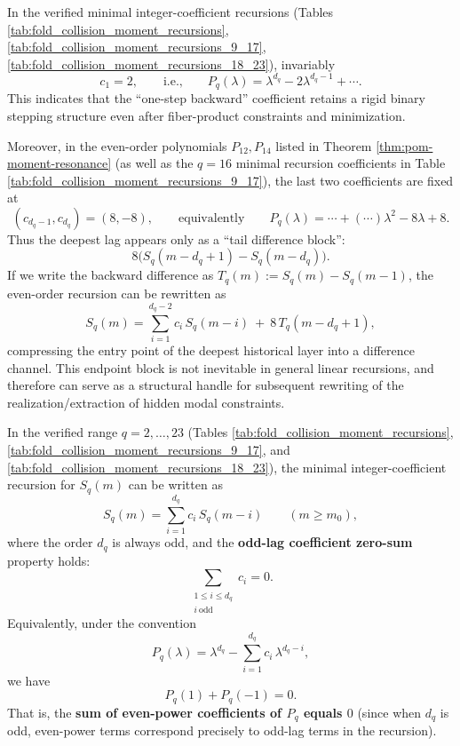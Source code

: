 




\begin{remark}\label{rem:pom-recurrence-endpoint-rigidity}
In the verified minimal integer-coefficient recursions (Tables \ref{tab:fold_collision_moment_recursions}, \ref{tab:fold_collision_moment_recursions_9_17}, \ref{tab:fold_collision_moment_recursions_18_23}), invariably
\[
c_1=2,
\qquad\text{i.e.,}\qquad
P_q(\lambda)=\lambda^{d_q}-2\lambda^{d_q-1}+\cdots.
\]
This indicates that the ``one-step backward'' coefficient retains a rigid binary stepping structure even after fiber-product constraints and minimization.
\par
Moreover, in the even-order polynomials \(P_{12},P_{14}\) listed in Theorem \ref{thm:pom-moment-resonance} (as well as the \(q=16\) minimal recursion coefficients in Table \ref{tab:fold_collision_moment_recursions_9_17}), the last two coefficients are fixed at
\[
(c_{d_q-1},c_{d_q})=(8,-8),
\qquad\text{equivalently}\qquad
P_q(\lambda)=\cdots+(\cdots)\lambda^2-8\lambda+8.
\]
Thus the deepest lag appears only as a ``tail difference block'':
\[
8\bigl(S_q(m-d_q+1)-S_q(m-d_q)\bigr).
\]
If we write the backward difference as \(T_q(m):=S_q(m)-S_q(m-1)\), the even-order recursion can be rewritten as
\[
S_q(m)=\sum_{i=1}^{d_q-2}c_i\,S_q(m-i)\ +\ 8\,T_q(m-d_q+1),
\]
compressing the entry point of the deepest historical layer into a difference channel.
This endpoint block is not inevitable in general linear recursions, and therefore can serve as a structural handle for subsequent rewriting of the realization/extraction of hidden modal constraints.
\end{remark}

\begin{proposition}\label{prop:pom-moment-odd-lag-neutrality}
In the verified range \(q=2,\dots,23\) (Tables \ref{tab:fold_collision_moment_recursions}, \ref{tab:fold_collision_moment_recursions_9_17}, and \ref{tab:fold_collision_moment_recursions_18_23}), the minimal integer-coefficient recursion for \(S_q(m)\) can be written as
\[
S_q(m)=\sum_{i=1}^{d_q} c_i\,S_q(m-i)\qquad(m\ge m_0),
\]
where the order \(d_q\) is always odd, and the \textbf{odd-lag coefficient zero-sum} property holds:
\[
\sum_{\substack{1\le i\le d_q\\ i\ \mathrm{odd}}} c_i=0.
\]
Equivalently, under the convention
\[
P_q(\lambda)=\lambda^{d_q}-\sum_{i=1}^{d_q}c_i\,\lambda^{d_q-i},
\]
we have
\[
P_q(1)+P_q(-1)=0.
\]
That is, the \textbf{sum of even-power coefficients of \(P_q\) equals \(0\)} (since when \(d_q\) is odd, even-power terms correspond precisely to odd-lag terms in the recursion).
\end{proposition}

